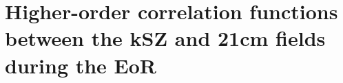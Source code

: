 \chapter{Higher-order correlation functions between the kSZ and 21cm fields during the EoR}
\label{chapter:ksz_21cm}